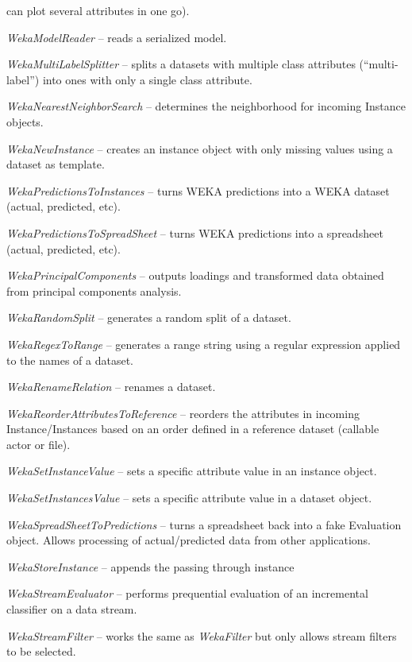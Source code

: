 \begin{tight_itemize}
	can plot several attributes in one go).
	\item \textit{WekaModelReader} -- reads a serialized model.
	\item \textit{WekaMultiLabelSplitter} -- splits a datasets with multiple
	class attributes (``multi-label'') into ones with only a single class 
	attribute.
	\item \textit{WekaNearestNeighborSearch} -- determines the neighborhood
	for incoming Instance objects.
	\item \textit{WekaNewInstance} -- creates an instance object with only
	missing values using a dataset as template.
	\item \textit{WekaPredictionsToInstances} -- turns WEKA predictions into
	a WEKA dataset (actual, predicted, etc).
	\item \textit{WekaPredictionsToSpreadSheet} -- turns WEKA predictions into
	a spreadsheet (actual, predicted, etc).
	\item \textit{WekaPrincipalComponents} -- outputs loadings and transformed
	data obtained from principal components analysis.
	\item \textit{WekaRandomSplit} -- generates a random split of a dataset.
	\item \textit{WekaRegexToRange} -- generates a range string using a regular
	expression applied to the names of a dataset.
	\item \textit{WekaRenameRelation} -- renames a dataset.
	\item \textit{WekaReorderAttributesToReference} -- reorders the attributes
	in incoming Instance/Instances based on an order defined in a reference
	dataset (callable actor or file).
	\item \textit{WekaSetInstanceValue} -- sets a specific attribute value in
	an instance object.
	\item \textit{WekaSetInstancesValue} -- sets a specific attribute value in
	a dataset object.
	\item \textit{WekaSpreadSheetToPredictions} -- turns a spreadsheet back
	into a fake Evaluation object. Allows processing of actual/predicted data
	from other applications.
	\item \textit{WekaStoreInstance} -- appends the passing through instance
	\item \textit{WekaStreamEvaluator} -- performs prequential evaluation
	of an incremental classifier on a data stream.
	\item \textit{WekaStreamFilter} -- works the same as
	\textit{WekaFilter} but only allows stream filters to be selected.

\end{tight_itemize}
